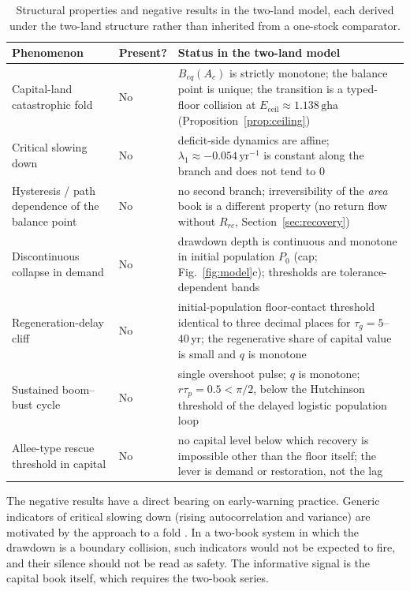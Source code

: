 \documentclass[preprint,12pt,authoryear]{elsarticle}
\newcommand{\Eceil}{E_{\mathrm{ceil}}}
\begin{document}
\begin{table}[!htbp]
\centering\small
\caption{Structural properties and negative results in the two-land model, each derived under the two-land structure rather than inherited from a one-stock comparator.}
\label{tab:neg}
\begin{tabularx}{\textwidth}{>{\raggedright\arraybackslash}p{} l X}
\toprule
Phenomenon & Present? & Status in the two-land model \\
\midrule
Capital-land catastrophic fold & No & $B_{eq}(A_c)$ is strictly monotone; the balance point is unique; the transition is a typed-floor collision at $\Eceil\approx1.138\,\mathrm{gha}$ (Proposition~\ref{prop:ceiling}) \\
Critical slowing down & No & deficit-side dynamics are affine; $\lambda_1\approx-0.054\,\mathrm{yr}^{-1}$ is constant along the branch and does not tend to $0$ \\
Hysteresis / path dependence of the balance point & No & no second branch; irreversibility of the \emph{area} book is a different property (no return flow without $R_{rc}$, Section~\ref{sec:recovery}) \\
Discontinuous collapse in demand & No & drawdown depth is continuous and monotone in initial population $P_0$ (cap; Fig.~\ref{fig:model}c); thresholds are tolerance-dependent bands \\
Regeneration-delay cliff & No & initial-population floor-contact threshold identical to three decimal places for $\tau_g=5$--$40$\,yr; the regenerative share of capital value is small and $q$ is monotone \\
Sustained boom--bust cycle & No & single overshoot pulse; $q$ is monotone; $r\tau_p=0.5<\pi/2$, below the Hutchinson threshold of the delayed logistic population loop \citep{Hutchinson1948} \\
Allee-type rescue threshold in capital & No & no capital level below which recovery is impossible other than the floor itself; the lever is demand or restoration, not the lag \\
\bottomrule
\end{tabularx}
\end{table}

The negative results have a direct bearing on early-warning practice. Generic indicators of critical slowing down (rising autocorrelation and variance) are motivated by the approach to a fold \citep{Scheffer2001}. In a two-book system in which the drawdown is a boundary collision, such indicators would not be expected to fire, and their silence should not be read as safety. The informative signal is the capital book itself, which requires the two-book series.
\end{document}

